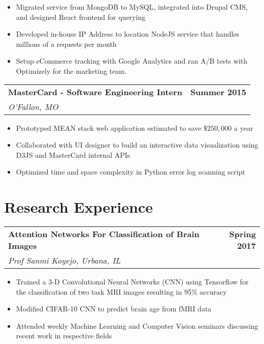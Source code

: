 \documentclass[letterpaper]{article}
\newenvironment{details}
{\begin{itemize}}
{\end{itemize}}
\begin{document}
  \begin{details}
  \item Migrated service from MongoDB to MySQL, integrated into Drupal CMS, and designed React
frontend for querying
  \item Developed in-house IP Address to location NodeJS service that handles millions of a requests per month
  \item Setup eCommerce tracking with Google Analytics and ran A/B tests with Optimizely for the marketing team.
  \end{details}

  \noindent
  \begin{tabularx}{\textwidth}{@{}X r@{}}
    \textbf{MasterCard - Software Engineering Intern} & \textbf{Summer 2015} \\
    \textit{O'Fallon, MO}
  \end{tabularx}

  \begin{details}
  	\item Prototyped MEAN stack web application estimated to save $\$250,000$ a year
  	\item Collaborated with UI designer to build an interactive data visualization using D3JS and MasterCard internal APIs 
  	\item Optimized time and space complexity in Python error log scanning script
  \end{details}
  
  \section{Research Experience}
  \noindent
  \begin{tabularx}{\textwidth}{@{}X r@{}}
  \textbf{Attention Networks For Classification of Brain Images} & \textbf{Spring 2017} \\
  \textit{Prof Sanmi Koyejo, Urbana, IL }
  \end{tabularx}
  \begin{details}
    \item Trained a 3-D Convolutional Neural Networks (CNN) using Tensorflow for the classification of two task MRI images resulting in 95\% accuracy
    \item Modified CIFAR-10 CNN to predict brain age from fMRI data
    \item Attended weekly Machine Learning and Computer Vision seminars discussing recent work in respective fields
  \end{details}
  
\end{document}

